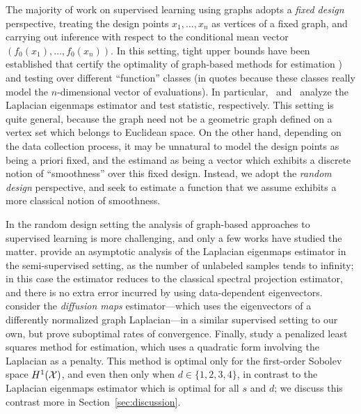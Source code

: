 The majority of work on supervised learning using graphs adopts a \emph{fixed design} perspective, treating the design points $x_1,\ldots,x_n$ as vertices of a fixed graph, and carrying out inference with respect to the conditional mean vector $(f_0(x_1),\ldots,f_0(x_n))$. In this setting, tight upper bounds have been established that certify the optimality of graph-based methods for estimation \citep{wang2016,hutter2016,sadhanala16,sadhanala17,kirichenko2017,kirichenko2018}) and testing \citep{sharpnack2010identifying,sharpnack2013b,sharpnack2013,sharpnack2015} over different ``function'' classes (in quotes because these classes really model the $n$-dimensional vector of evaluations). In particular,~\citet{sadhanala16} and~\citet{sharpnack2015} analyze the Laplacian eigenmaps estimator and test statistic, respectively. This setting is quite general, because the graph need not be a geometric graph defined on a vertex set which belongs to Euclidean space. On the other hand, depending on the data collection process, it may be unnatural to model the design points as being a priori fixed, and the estimand as being a vector which exhibits a discrete notion of ``smoothness'' over this fixed design. Instead, we adopt the \emph{random design} perspective, and seek to estimate a function that we assume exhibits a more classical notion of smoothness. 

In the random design setting the analysis of graph-based approaches to supervised learning is more challenging, and only a few works have studied the matter. \cite{zhou2011} provide an asymptotic analysis of the Laplacian eigenmaps estimator in the semi-supervised setting, as the number of unlabeled samples tends to infinity; in this case the estimator reduces to the classical spectral projection estimator, and there is no extra error incurred by using data-dependent eigenvectors. \cite{lee2016} consider the \emph{diffusion maps} estimator---which uses the eigenvectors of a differently normalized graph Laplacian---in a similar supervised setting to our own, but prove suboptimal rates of convergence. Finally, \citet{trillos2020,green2021} study a penalized least squares method for estimation, which uses a quadratic form involving the Laplacian as a penalty. This method is optimal only for the first-order Sobolev space $H^1(\mathcal{X})$, and even then only when $d \in \{1,2,3,4\}$, in contrast to the Laplacian eigenmaps estimator which is optimal for all $s$ and $d$; we discuss this contrast more in Section~\ref{sec:discussion}.

